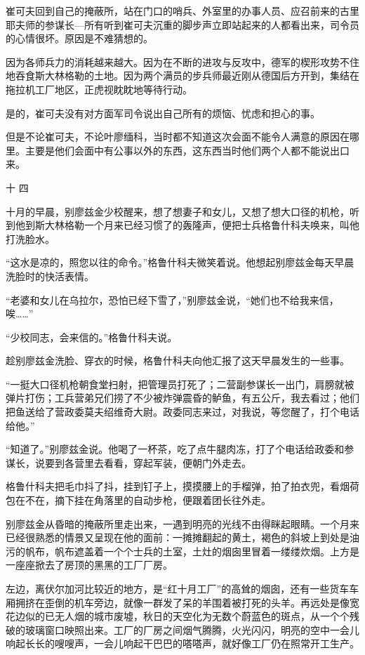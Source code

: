 崔可夫回到自己的掩蔽所，站在门口的哨兵、外室里的办事人员、应召前来的古里耶夫师的参谋长—所有听到崔可夫沉重的脚步声立即站起来的人都看出来，司令员的心情很坏。原因是不难猜想的。

因为各师兵力的消耗越来越大。因为在不断的进攻与反攻中，德军的楔形攻势不住地吞食斯大林格勒的土地。因为两个满员的步兵师最近刚从德国后方开到，集结在拖拉机工厂地区，正虎视眈眈地等待行动。

是的，崔可夫没有对方面军司令说出自己所有的烦恼、忧虑和担心的事。

但是不论崔可夫，不论叶廖缅科，当时都不知道这次会面不能令人满意的原因在哪里。主要是他们会面中有公事以外的东西，这东西当时他们两个人都不能说出口来。

十 四

十月的早晨，别廖兹金少校醒来，想了想妻子和女儿，又想了想大口径的机枪，听到他到斯大林格勒一个月来已经习惯了的轰隆声，便把士兵格鲁什科夫唤来，叫他打洗脸水。

“这水是凉的，照您以往的命令。”格鲁什科夫微笑着说。他想起别廖兹金每天早晨洗脸时的快活表情。

“老婆和女儿在乌拉尔，恐怕已经下雪了，”别廖兹金说，“她们也不给我来信，唉……”

“少校同志，会来信的。”格鲁什科夫说。

趁别廖兹金洗脸、穿衣的时候，格鲁什科夫向他汇报了这天早晨发生的一些事。

“一挺大口径机枪朝食堂扫射，把管理员打死了；二营副参谋长一出门，肩膀就被弹片打伤；工兵营弟兄们捞了不少被炸弹震昏的鲈鱼，有五公斤，我去看过；他们把鱼送给了营政委莫夫绍维奇大尉。政委同志来过，对我说，等您醒了，打个电话给他。”

“知道了。”别廖兹金说。他喝了一杯茶，吃了点牛腿肉冻，打了个电话给政委和参谋长，说要到各营里去看看，穿起军装，便朝门外走去。

格鲁什科夫把毛巾抖了抖，挂到钉子上，摸摸腰上的手榴弹，拍了拍衣兜，看烟荷包在不在，摘下挂在角落里的自动步枪，便跟着团长往外走。

别廖兹金从昏暗的掩蔽所里走出来，一遇到明亮的光线不由得眯起眼睛。一个月来已经很熟悉的情景又呈现在他的面前：一摊摊翻起的黄土，褐色的斜坡上到处是油污的帆布，帆布遮盖着一个个士兵的土室，土灶的烟囱里冒着一缕缕炊烟。上方是一座座掀去了房顶的黑黑的工厂厂房。

左边，离伏尔加河比较近的地方，是“红十月工厂”的高耸的烟囱，还有一些货车车厢拥挤在歪倒的机车旁边，就像一群发了呆的羊围着被打死的头羊。再远处是像宽花边似的已无人烟的城市废墟，秋日的天空化为无数个蔚蓝色的斑点，从一个个残破的玻璃窗口映照出来。工厂的厂房之间烟气腾腾，火光闪闪，明亮的空中一会儿响起长长的嗖嗖声，一会儿响起干巴巴的嗒嗒声，就好像工厂仍在照常开工生产。


